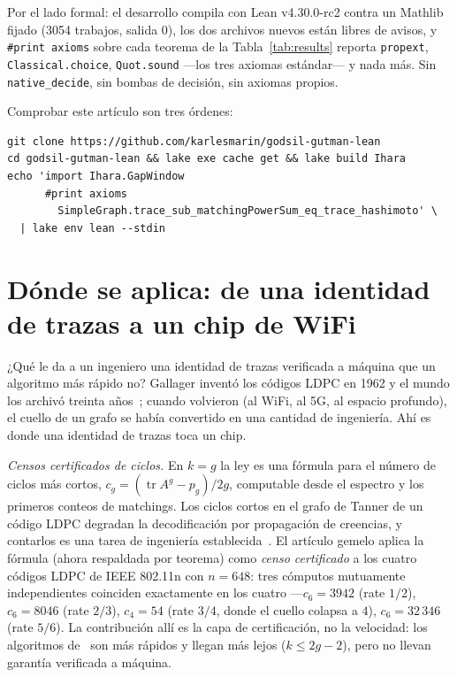 \documentclass[11pt]{article}
\newcommand{\lean}[1]{\texttt{#1}}
\DeclareMathOperator{\tr}{tr}
\begin{document}
Por el lado formal: el desarrollo compila con Lean v4.30.0-rc2 contra un Mathlib fijado
(3054 trabajos, salida 0), los dos archivos nuevos están libres de avisos, y
\lean{\#print axioms} sobre cada teorema de la Tabla~\ref{tab:results} reporta
\lean{propext}, \lean{Classical.choice}, \lean{Quot.sound} ---los tres axiomas estándar--- y
nada más. Sin \lean{native\_decide}, sin bombas de decisión, sin axiomas propios.

Comprobar este artículo son tres órdenes:
\begin{tcolorbox}[colframe=ggteal!70,colback=ggband!20,arc=3pt,boxrule=0.8pt]
\footnotesize\begin{verbatim}
git clone https://github.com/karlesmarin/godsil-gutman-lean
cd godsil-gutman-lean && lake exe cache get && lake build Ihara
echo 'import Ihara.GapWindow
      #print axioms
        SimpleGraph.trace_sub_matchingPowerSum_eq_trace_hashimoto' \
  | lake env lean --stdin
\end{verbatim}
\end{tcolorbox}

\section{Dónde se aplica: de una identidad de trazas a un chip de WiFi}
\label{sec:applications}

¿Qué le da a un ingeniero una identidad de trazas verificada a máquina que un algoritmo más
rápido no? Gallager inventó los códigos LDPC en 1962 y el mundo los archivó treinta
años~\cite{Gallager1962}; cuando volvieron (al WiFi, al 5G, al espacio profundo), el cuello
de un grafo se había convertido en una cantidad de ingeniería. Ahí es donde una identidad de
trazas toca un chip.

\emph{Censos certificados de ciclos.} En $k = g$ la ley es una fórmula para el número de
ciclos más cortos, $c_g = (\tr A^g - p_g)/2g$, computable desde el espectro y los primeros
conteos de matchings. Los ciclos cortos en el grafo de Tanner de un código LDPC degradan la
decodificación por propagación de creencias, y contarlos es una tarea de ingeniería
establecida~\cite{KarimiBanihashemi2013,BlakeLin2018}. El artículo gemelo aplica la fórmula
(ahora respaldada por teorema) como \emph{censo certificado} a los cuatro códigos LDPC de
IEEE 802.11n con $n = 648$: tres cómputos mutuamente independientes coinciden exactamente en
los cuatro ---$c_6 = 3942$ (rate $1/2$), $c_6 = 8046$ (rate $2/3$), $c_4 = 54$ (rate $3/4$,
donde el cuello colapsa a $4$), $c_6 = 32\,346$ (rate $5/6$). La contribución allí es la
capa de certificación, no la velocidad: los algoritmos
de~\cite{KarimiBanihashemi2013,BlakeLin2018} son más rápidos y llegan más lejos
($k \le 2g-2$), pero no llevan garantía verificada a máquina.
\end{document}
